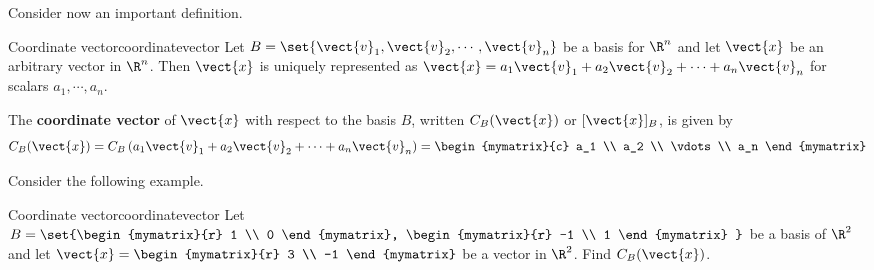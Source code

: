 Consider now an important definition.

\begin{definition}{Coordinate vector}{coordinatevector}
Let $B = \set{\vect{v}_1, \vect{v}_2, \cdots, \vect{v}_n }$
be a basis for $\R^n$ and let $\vect{x}$ be an arbitrary
vector in $\R^n$. Then $\vect{x}$ is uniquely represented as
$\vect{x} = a_1\vect{v}_1 +
a_2\vect{v}_2 + \cdots + a_n\vect{v}_n$ for scalars $a_1, \cdots,
a_n$. 

The  \textbf{coordinate vector} of $\vect{x}$ with respect to the
basis $B$, written $C_B(\vect{x})$ or  $[\vect{x}]_B$,  is given by
\[
C_B(\vect{x}) =  C_B \left( a_1\vect{v}_1 + a_2\vect{v}_2 + \cdots + a_n\vect{v}_n \right) = \begin{mymatrix}{c}
a_1 \\
a_2 \\
\vdots \\
a_n
\end{mymatrix}
\] 
\end{definition}

Consider the following example.

\begin{example}{Coordinate vector}{coordinatevector}
Let $B = \set{\begin{mymatrix}{r}
1 \\
0 
\end{mymatrix}, \begin{mymatrix}{r}
-1 \\
1
\end{mymatrix} }$ be a basis of $\R^2$ and let $\vect{x} = \begin{mymatrix}{r}
3 \\
-1
\end{mymatrix}$ be a vector in $\R^2$. Find $C_B(\vect{x})$. 
\end{example}


